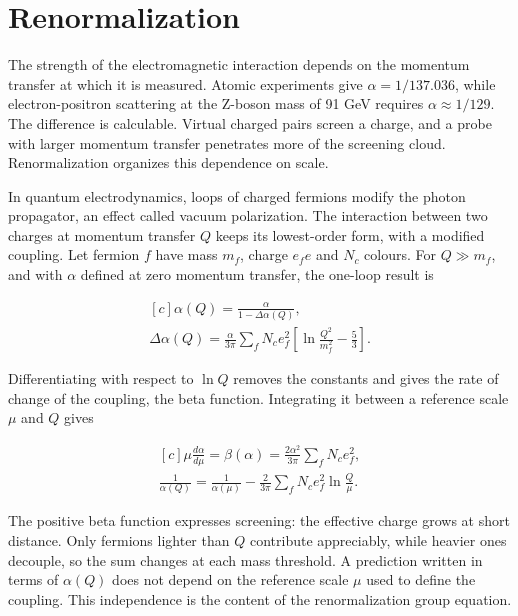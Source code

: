 \documentclass[11pt,oneside]{book}
\newenvironment{centeredalign}{\[\begin{gathered}[c]}{\end{gathered}\]}
\begin{document}
\clearpage

\section{Renormalization}

\label{topic:renormalization}

The strength of the electromagnetic interaction depends on the momentum transfer at which it is measured. Atomic experiments give \(\alpha=1/137.036\), while electron-positron scattering at the Z-boson mass of 91 GeV requires \(\alpha\approx1/129\). The difference is calculable. Virtual charged pairs screen a charge, and a probe with larger momentum transfer penetrates more of the screening cloud. Renormalization organizes this dependence on scale.

In quantum electrodynamics, loops of charged fermions modify the photon propagator, an effect called vacuum polarization. The interaction between two charges at momentum transfer \(Q\) keeps its lowest-order form, with a modified coupling. Let fermion \(f\) have mass \(m_f\), charge \(e_fe\) and \(N_c\) colours. For \(Q\gg m_f\), and with \(\alpha\) defined at zero momentum transfer, the one-loop result is

\begin{centeredalign}
\alpha(Q)=\frac{\alpha}{1-\Delta\alpha(Q)},\\
\Delta\alpha(Q)=\frac{\alpha}{3\pi}\sum_fN_ce_f^2\left[\ln\frac{Q^2}{m_f^2}-\frac53\right].
\end{centeredalign}

Differentiating with respect to \(\ln Q\) removes the constants and gives the rate of change of the coupling, the beta function. Integrating it between a reference scale \(\mu\) and \(Q\) gives

\begin{centeredalign}
\mu\frac{d\alpha}{d\mu}=\beta(\alpha)=\frac{2\alpha^2}{3\pi}\sum_fN_ce_f^2,\\
\frac{1}{\alpha(Q)}=\frac{1}{\alpha(\mu)}-\frac{2}{3\pi}\sum_fN_ce_f^2\ln\frac{Q}{\mu}.
\end{centeredalign}

The positive beta function expresses screening: the effective charge grows at short distance. Only fermions lighter than \(Q\) contribute appreciably, while heavier ones decouple, so the sum changes at each mass threshold. A prediction written in terms of \(\alpha(Q)\) does not depend on the reference scale \(\mu\) used to define the coupling. This independence is the content of the renormalization group equation.
\end{document}
